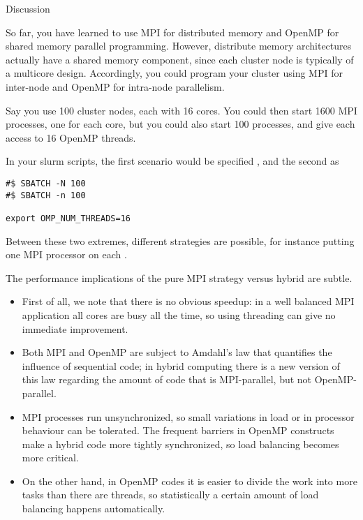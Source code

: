 
 {Discussion}

So far, you have learned to use MPI for distributed memory and OpenMP
for shared memory parallel programming. However, distribute memory
architectures actually have a shared memory component, since each
cluster node is typically of a multicore design. Accordingly, you
could program your cluster using MPI for inter-node and OpenMP for
intra-node parallelism.

Say you use 100 cluster nodes, each with 16 cores. You could then
start 1600 MPI processes, one for each core, but you could also start
100 processes, and give each access to 16 OpenMP threads.

\begin{tacc}
In your slurm scripts, the first scenario would be specified , and the second as
\begin{verbatim}
#$ SBATCH -N 100
#$ SBATCH -n 100

export OMP_NUM_THREADS=16
\end{verbatim}
\end{tacc}

Between these two extremes, different strategies are possible, for
instance putting one MPI processor on each .

The performance implications of the pure MPI strategy versus hybrid
are subtle.
\begin{itemize}
\item First of all, we note that there is no obvious speedup: in a
  well balanced MPI application all cores are busy all the time, so
  using threading can give no immediate improvement.
\item Both MPI and OpenMP are subject to Amdahl's law that quantifies
  the influence of sequential code; in hybrid computing there is a new
  version of this law regarding the amount of code that is
  MPI-parallel, but not OpenMP-parallel.
\item MPI processes run unsynchronized, so small variations in load or
  in processor behaviour can be tolerated. The frequent barriers in
  OpenMP constructs make a hybrid code more tightly synchronized, so
  load balancing becomes more critical.
\item On the other hand, in OpenMP codes it is easier to divide the
  work into more tasks than there are threads, so statistically a
  certain amount of load balancing happens automatically.
\end{itemize}

